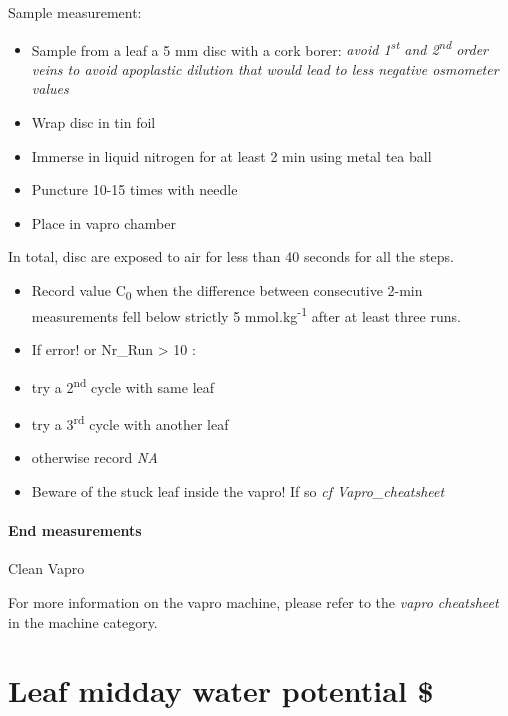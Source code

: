 \documentclass[
  12pt,
  american,
  a4paper,
  extrafontsizes,onecolumn,openright
  ]{memoir}
\providecommand{\tightlist}{%
  \setlength{\itemsep}{0pt}\setlength{\parskip}{0pt}}
\begin{document}
Sample measurement:

\begin{itemize}
\tightlist
\item
  Sample from a leaf a 5 mm disc with a cork borer: \emph{avoid 1\textsuperscript{st} and 2\textsuperscript{nd} order veins to avoid apoplastic dilution that would lead to less negative osmometer values}
\item
  Wrap disc in tin foil
\item
  Immerse in liquid nitrogen for at least 2 min using metal tea ball
\item
  Puncture 10-15 times with needle
\item
  Place in vapro chamber
\end{itemize}

In total, disc are exposed to air for less than 40 seconds for all the steps.

\begin{itemize}
\item
  Record value C\textsubscript{0} when the difference between consecutive 2-min measurements fell below strictly 5 mmol.kg\textsuperscript{-1} after at least three runs.
\item
  If error! or Nr\_Run \textgreater{} 10 :
\item
  try a 2\textsuperscript{nd} cycle with same leaf
\item
  try a 3\textsuperscript{rd} cycle with another leaf
\item
  otherwise record \emph{NA}
\item
  Beware of the stuck leaf inside the vapro! If so \emph{cf Vapro\_cheatsheet}
\end{itemize}

\hypertarget{end-measurements}{%
\subsubsection{End measurements}\label{end-measurements}}

Clean Vapro

For more information on the vapro machine, please refer to the \emph{vapro cheatsheet} in the machine category.

\hypertarget{leaf-midday-water-potential}{%
\chapter{Leaf midday water potential \$}\label{leaf-midday-water-potential}}
\end{document}

